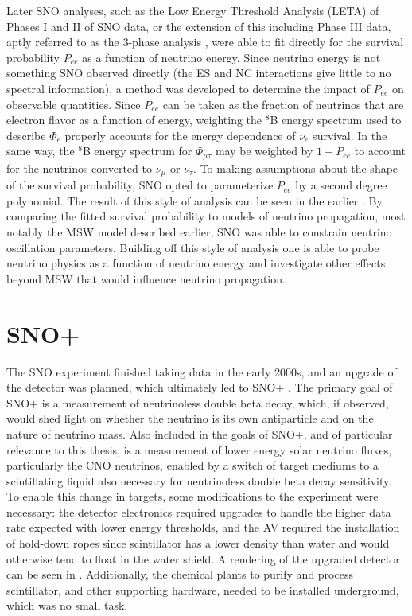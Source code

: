 Later SNO analyses, such as the Low Energy Threshold Analysis (LETA) \cite{leta} of Phases I and II of SNO data, or the extension of this including Phase III data, aptly referred to as the 3-phase analysis \cite{3phase}, were able to fit directly for the survival probability $P_{ee}$ as a function of neutrino energy.
Since neutrino energy is not something SNO observed directly (the ES and NC interactions give little to no spectral information), a method was developed to determine the impact of $P_{ee}$ on observable quantities.
Since $P_{ee}$ can be taken as the fraction of neutrinos that are electron flavor as a function of energy, weighting the $^8$B energy spectrum used to describe $\Phi_e$ properly accounts for the energy dependence of $\nu_e$ survival.
In the same way, the $^8$B energy spectrum for $\Phi_{\mu\tau}$ may be weighted by $1-P_{ee}$ to account for the neutrinos converted to $\nu_\mu$ or $\nu_\tau$.
To making assumptions about the shape of the survival probability, SNO opted to parameterize $P_{ee}$ by a second degree polynomial.
The result of this style of analysis can be seen in the earlier .
By comparing the fitted survival probability to models of neutrino propagation, most notably the MSW model described earlier, SNO was able to constrain neutrino oscillation parameters.
Building off this style of analysis one is able to probe neutrino physics as a function of neutrino energy and investigate other effects beyond MSW that would influence neutrino propagation.

\section{SNO+}

The SNO experiment finished taking data in the early 2000s, and an upgrade of the detector was planned, which ultimately led to SNO+ \cite{snop}.
The primary goal of SNO+ is a measurement of neutrinoless double beta decay, which, if observed, would shed light on whether the neutrino is its own antiparticle and on the nature of neutrino mass.
Also included in the goals of SNO+, and of particular relevance to this thesis, is a measurement of lower energy solar neutrino fluxes, particularly the CNO neutrinos, enabled by a switch of target mediums to a scintillating liquid also necessary for neutrinoless double beta decay sensitivity.
To enable this change in targets, some modifications to the experiment were necessary: the detector electronics required upgrades to handle the higher data rate expected with lower energy thresholds, and the AV required the installation of hold-down ropes since scintillator has a lower density than water and would otherwise tend to float in the water shield.
A rendering of the upgraded detector can be seen in .
Additionally, the chemical plants to purify and process scintillator, and other supporting hardware, needed to be installed underground, which was no small task.

